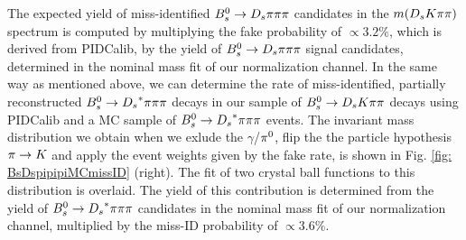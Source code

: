 The expected yield of miss-identified ${{B}^0_{s}}\rightarrow{\ensuremath{{D}_{s}}}{\ensuremath{\pi}}{\ensuremath{\pi}}{\ensuremath{\pi}}$ candidates in the $m({{D}_{s}}{K}{\pi}{\pi})$ spectrum is computed by multiplying the fake probability of $\propto3.2\%$, which is derived from PIDCalib, by the yield of ${{B}^0_{s}}\rightarrow{\ensuremath{{D}_{s}}}{\ensuremath{\pi}}{\ensuremath{\pi}}{\ensuremath{\pi}}$ signal candidates, determined in the nominal mass fit of our normalization channel.  \newline
In the same way as mentioned above, we can determine the rate of miss-identified, partially reconstructed ${{B}^0_{s}}\rightarrow{\ensuremath{{D}_{s}}}^{*}{\pi}{\pi}{\pi}$ decays in our sample of ${{B}^0_{s}}\rightarrow{\ensuremath{{D}_{s}}}{\ensuremath{K}}{\ensuremath{\pi}}{\ensuremath{\pi}}$ decays using PIDCalib and a MC sample of ${{B}^0_{s}}\rightarrow{\ensuremath{{D}_{s}}}^{*}{\pi}{\pi}{\pi}$ events. The invariant mass distribution we obtain when we exlude the $\gamma$/${{\pi}^0}$, flip the the particle hypothesis ${\pi}\rightarrow{\ensuremath{K}}$ and apply the event weights given by the fake rate, is shown in Fig. \ref{fig: BsDspipipiMCmissID} (right). The fit of two crystal ball functions to this distribution is overlaid. 
The yield of this contribution is determined from the yield of ${{B}^0_{s}}\rightarrow{\ensuremath{{D}_{s}}}^{*}{\pi}{\pi}{\pi}$ candidates in the nominal mass fit of our normalization channel, multiplied by the miss-ID probability of $\propto 3.6\%$.

